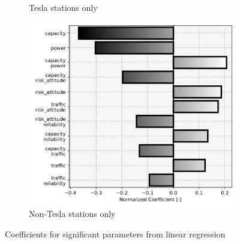 \begin{figure}[H]
\begin{subfigure}[t]{.33\linewidth}
	\caption{Tesla stations only}
\end{subfigure}%
\begin{subfigure}[t]{.33\linewidth}
	\centering\captionsetup{width = .8\linewidth}
	\includegraphics[width = \linewidth]{figs/significant_parameters_new_2.png}
	\caption{Non-Tesla stations only}
\end{subfigure}

\caption{Coefficients for significant parameters from linear regression}
\label{fig:significant_parameters_0}

\end{figure}

